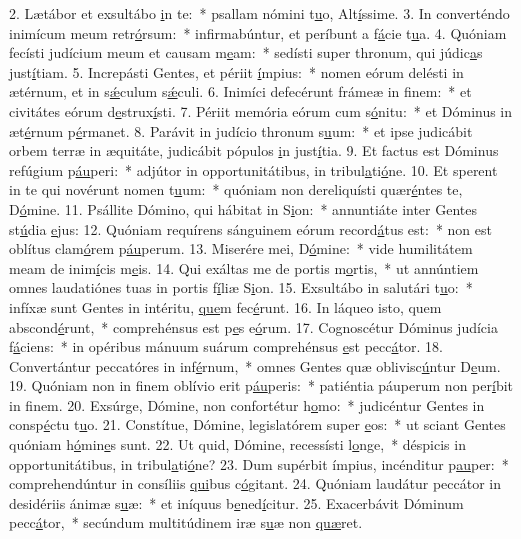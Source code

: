 2. Lætábor et exsultábo \uline{i}n te:~* psallam nómini t\uline{u}o, Alt\uline{í}ssime.
3. In converténdo inimícum meum retr\uline{ó}rsum:~* infirmabúntur, et períbunt a f\uline{á}cie t\uline{u}a.
4. Quóniam fecísti judícium meum et causam m\uline{e}am:~* sedísti super thronum, qui júdic\uline{a}s just\uline{í}tiam.
5. Increpásti Gentes, et périit \uline{í}mpius:~* nomen eórum delésti in ætérnum, et in s\uline{ǽ}culum s\uline{ǽ}culi.
6. Inimíci defecérunt frámeæ in f\uline{i}nem:~* et civitátes eórum d\uline{e}strux\uline{í}sti.
7. Périit memória eórum cum s\uline{ó}nitu:~* et Dóminus in æt\uline{é}rnum p\uline{é}rmanet.
8. Parávit in judício thronum s\uline{u}um:~* et ipse judicábit orbem terræ in æquitáte, judicábit pópulos \uline{i}n just\uline{í}tia.
9. Et factus est Dóminus refúgium p\uline{áu}peri:~* adjútor in opportunitátibus, in tribul\uline{a}ti\uline{ó}ne.
10. Et sperent in te qui novérunt nomen t\uline{u}um:~* quóniam non dereliquísti quær\uline{é}ntes te, D\uline{ó}mine.
11. Psállite Dómino, qui hábitat in S\uline{i}on:~* annuntiáte inter Gentes st\uline{ú}dia \uline{e}jus:
12. Quóniam requírens sánguinem eórum record\uline{á}tus est:~* non est oblítus clam\uline{ó}rem p\uline{áu}perum.
13. Miserére mei, D\uline{ó}mine:~* vide humilitátem meam de inim\uline{í}cis m\uline{e}is.
14. Qui exáltas me de portis m\uline{o}rtis,~* ut annúntiem omnes laudatiónes tuas in portis f\uline{í}liæ S\uline{i}on.
15. Exsultábo in salutári t\uline{u}o:~* infíxæ sunt Gentes in intéritu, \uline{que}m fec\uline{é}runt.
16. In láqueo isto, quem abscond\uline{é}runt,~* comprehénsus est p\uline{e}s e\uline{ó}rum.
17. Cognoscétur Dóminus judícia f\uline{á}ciens:~* in opéribus mánuum suárum comprehénsus \uline{e}st pecc\uline{á}tor.
18. Convertántur peccatóres in inf\uline{é}rnum,~* omnes Gentes quæ oblivisc\uline{ú}ntur D\uline{e}um.
19. Quóniam non in finem oblívio erit p\uline{áu}peris:~* patiéntia páuperum non per\uline{í}bit in f\uline{i}nem.
20. Exsúrge, Dómine, non confortétur h\uline{o}mo:~* judicéntur Gentes in consp\uline{é}ctu t\uline{u}o.
21. Constítue, Dómine, legislatórem super \uline{e}os:~* ut sciant Gentes quóniam h\uline{ó}min\uline{e}s sunt.
22. Ut quid, Dómine, recessísti l\uline{o}nge,~* déspicis in opportunitátibus, in tribul\uline{a}ti\uline{ó}ne?
23. Dum supérbit ímpius, incénditur p\uline{au}per:~* comprehendúntur in consíliis \uline{qui}bus c\uline{ó}gitant.
24. Quóniam laudátur peccátor in desidériis ánimæ s\uline{u}æ:~* et iníquus b\uline{e}ned\uline{í}citur.
25. Exacerbávit Dóminum pecc\uline{á}tor,~* secúndum multitúdinem iræ s\uline{u}æ non \uline{quæ}ret.
